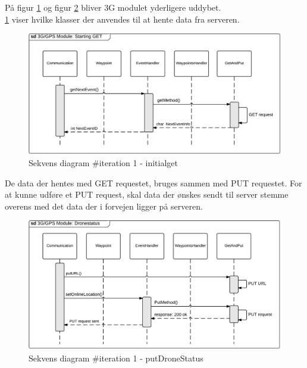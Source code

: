 På figur \ref{fig:Sekvens_diagram_initialget} og figur \ref{fig:Sekvens_diagram_putDroneStatus} bliver 3G modulet yderligere uddybet.\\
\ref{fig:Sekvens_diagram_initialget} viser hvilke klasser der anvendes til at hente data fra serveren. 

\begin{figure}[H]
	\centering
	\includegraphics[width=1\textwidth]{Billeder/sekvens/sekvens_iteration1_initialget}
	\caption{Sekvens diagram \#iteration 1 - initialget}
	\label{fig:Sekvens_diagram_initialget}
\end{figure}

\vspace{.5cm}

De data der hentes med GET requestet, bruges sammen med PUT requestet. For at kunne udføre et PUT request, skal data der ønskes sendt til server stemme overens med det data der i forvejen ligger på serveren.

\begin{figure}[H]
	\centering
	\includegraphics[width=1\textwidth]{Billeder/sekvens/sekvens_iteration1_putdronestatus}
	\caption{Sekvens diagram \#iteration 1 - putDroneStatus}
	\label{fig:Sekvens_diagram_putDroneStatus}
\end{figure}


